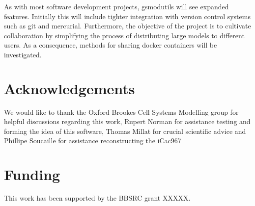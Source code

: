 \documentclass[a4paper,10pt]{article}
\begin{document}

As with most software development projects, gsmodutils will see expanded features.
Initially this will include tighter integration with version control systems such as git and mercurial.
Furthermore, the objective of the project is to cultivate collaboration by simplifying the process of distributing large models to different users.
As a consequence, methods for sharing docker containers will be investigated.

\section*{Acknowledgements}
We would like to thank the Oxford Brookes Cell Systems Modelling group for helpful discussions regarding this work, Rupert Norman for assistance testing and forming the idea of this software, Thomas Millat for crucial scientific advice and Phillipe Soucaille for assistance reconstructing the iCac967

\section*{Funding}
This work has been supported by the BBSRC grant XXXXX.




\end{document}
